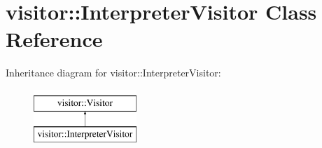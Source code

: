 \hypertarget{classvisitor_1_1InterpreterVisitor}{}\section{visitor\+:\+:Interpreter\+Visitor Class Reference}
\label{classvisitor_1_1InterpreterVisitor}
Inheritance diagram for visitor\+:\+:Interpreter\+Visitor\+:\begin{figure}[H]
\begin{center}
\leavevmode
\includegraphics[height=2.000000cm]{d3/d91/classvisitor_1_1InterpreterVisitor}
\end{center}
\end{figure}
